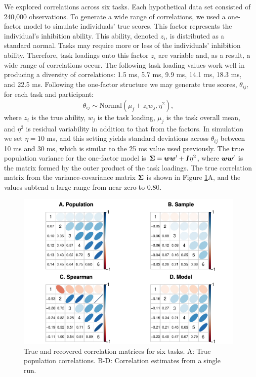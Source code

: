 \documentclass[
  ,man]{apa6}
\begin{document}
We explored correlations across six tasks. Each hypothetical data set consisted of 240,000 observations. To generate a wide range of correlations, we used a one-factor model to simulate individuals' true scores. This factor represents the individual's inhibition ability. This ability, denoted \(z_i\), is distributed as a standard normal. Tasks may require more or less of the individuals' inhibition ability. Therefore, task loadings onto this factor \(z_i\) are variable and, as a result, a wide range of correlations occur. The following task loading values work well in producing a diversity of correlations: 1.5 ms, 5.7 ms, 9.9 ms, 14.1 ms, 18.3 ms, and 22.5 ms. Following the one-factor structure we may generate true scores, \(\theta_{ij}\), for each task and participant:
\[
\theta_{ij} \sim \mbox{Normal}(\mu_j+z_iw_j,\eta^2),
\]
where \(z_i\) is the true ability, \(w_j\) is the task loading, \(\mu_j\) is the task overall mean, and \(\eta^2\) is residual variability in addition to that from the factors. In simulation we set \(\eta=10\) ms, and this setting yields standard deviations across \(\theta_{ij}\) between 10 ms and 30 ms, which is similar to the 25 ms value used previously. The true population variance for the one-factor model is \(\bm \Sigma = \bm w\bm w' + \bm I\eta^2\), where \(\bm w\bm w'\) is the matrix formed by the outer product of the task loadings. The true correlation matrix from the variance-covariance matrix \(\bm \Sigma\) is shown in Figure \ref{fig:cov6}A, and the values subtend a large range from near zero to 0.80.

\begin{figure}
\centering
\includegraphics{p_files/figure-latex/cov6-1.pdf}
\caption{\label{fig:cov6}True and recovered correlation matrices for six tasks. A: True population correlations. B-D: Correlation estimates from a single run.}
\end{figure}
\end{document}
